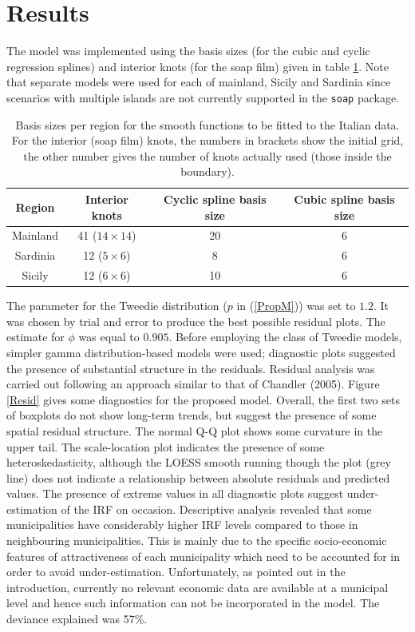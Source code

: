 \section{Results \label{ER}}

The model was implemented using the basis sizes (for the cubic and cyclic regression splines) and interior knots (for the soap film) given in table \ref{soap-basis-table}. Note that separate models were used for each of mainland, Sicily and Sardinia since scenarios with multiple islands are not currently supported in the \texttt{soap} package.

\begin{table}[t]
\centering
\begin{tabular}{c c c c}\\
Region & Interior knots & Cyclic spline basis size & Cubic spline basis size\\
\hline
Mainland & 41 ($14 \times 14$) & 20 & 6\\
Sardinia & 12 ($5 \times 6$) & 8 & 6\\
Sicily & 12 ($6 \times 6$) & 10 & 6\\
\end{tabular}
\caption{Basis sizes per region for the smooth functions to be fitted to the Italian data. For the interior (soap film) knots, the numbers in brackets show the initial grid, the other number gives the number of knots actually used (those inside the boundary).}
\label{soap-basis-table}
\end{table}

The parameter for the Tweedie distribution ($p$ in (\ref{PropM})) was set to $1.2$. It was chosen by trial and error to produce the best possible residual plots. The estimate for $\phi$ was equal to $0.905$. Before employing the class of Tweedie models, simpler gamma distribution-based models were used; diagnostic plots suggested the presence of substantial structure in the residuals. Residual analysis was carried out following an approach similar to that of Chandler (2005). Figure \ref{Resid} gives some diagnostics for the proposed model. Overall, the first two sets of boxplots do not show long-term trends, but suggest the presence of some spatial residual structure. The normal Q-Q plot shows some curvature in the upper tail. The scale-location plot indicates the presence of some heteroskedasticity, although the LOESS smooth running though the plot (grey line) does not indicate a relationship between absolute residuals and predicted values. The presence of extreme values in all diagnostic plots suggest under-estimation of the IRF on occasion. Descriptive analysis revealed that some municipalities have considerably higher IRF levels compared to those in neighbouring municipalities. This is mainly due to the specific socio-economic features of attractiveness of each municipality which need to be accounted for in order to avoid under-estimation. Unfortunately, as pointed out in the introduction, currently no relevant economic data are available at a municipal level and hence such information can not be incorporated in the model. The deviance explained was 57\%. 

